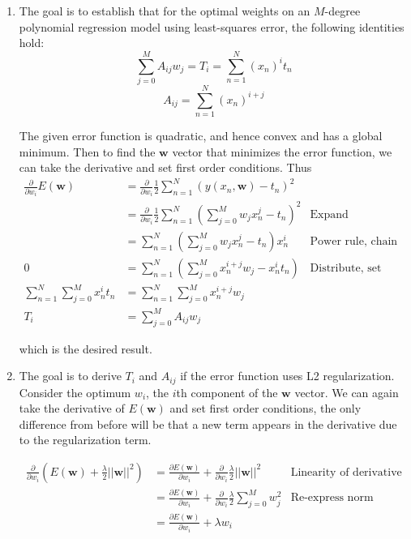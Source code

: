 \documentclass[../main.tex]{subfiles}
\begin{document}
	\begin{enumerate}
		\item The goal is to establish that for the optimal weights on an $M$-degree polynomial regression model using least-squares error, the following identities hold:
$$\sum_{j=0}^M A_{ij}w_j = T_i = \sum_{n=1}^N (x_n)^i t_n$$
$$A_{ij} = \sum_{n=1}^N (x_n)^{i+j}$$

The given error function is quadratic, and hence convex and has a global minimum. Then to find the $\mathbf{w}$ vector that minimizes the error function, we can take the derivative and set first order conditions. Thus
\begin{align*}
	\frac{\partial}{\partial w_i}E(\mathbf{w}) &= \frac{\partial}{\partial w_i} \frac{1}{2}\sum_{n=1}^{N}\left(y(x_n, \mathbf{w}) - t_n\right)^2 &\\
	&= \frac{\partial}{\partial w_i} \frac{1}{2}\sum_{n=1}^{N}\left(\sum_{j=0}^M w_j x_n^j - t_n\right)^2 &\text{Expand}\\
	&= \sum_{n=1}^N \left(\sum_{j=0}^M w_j x_n^j - t_n\right)x_n^i &\text{Power rule, chain rule}\\
	0 &=\sum_{n=1}^N\left(\sum_{j=0}^M x_n^{i+j} w_j  - x_n^i t_n\right) &\text{Distribute, set FOC}\\
	\sum_{n=1}^N \sum_{j=0}^M x_n^i t_n &= \sum_{n=1}^N \sum_{j=0}^M x_n^{i+j} w_j &\\
T_i &= \sum_{j=0}^M A_{ij} w_j
\end{align*}

which is the desired result.

\item The goal is to derive $T_i$ and $A_{ij}$ if the error function uses L2 regularization. Consider the optimum $w_i$, the $i$th component of the $\mathbf{w}$ vector. We can again take the derivative of $E(\mathbf{w})$ and set first order conditions, the only difference from before will be that a new term appears in the derivative due to the regularization term.

\begin{align*}
	\frac{\partial}{\partial w_i}\left(E(\mathbf{w}) + \frac{\lambda}{2}||\mathbf{w}||^2\right) &= \frac{\partial E(\mathbf{w}) }{\partial w_i}+ \frac{\partial}{\partial w_i}\frac{\lambda}{2}||\mathbf{w}||^2 &\text{Linearity of derivative}\\
	&=\frac{\partial E(\mathbf{w}) }{\partial w_i}+ \frac{\partial}{\partial w_i}\frac{\lambda}{2}\sum_{j=0}^M w_j^2 &\text{Re-express norm}\\
	&= \frac{\partial E(\mathbf{w}) }{\partial w_i} + \lambda w_i &\\
\end{align*}


\end{enumerate}
\end{document}

